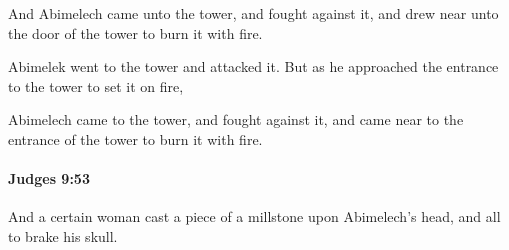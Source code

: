 			\begin{versebox}
					\item[BHS] 
					\item[ASV] And Abimelech came unto the tower, and fought against it, and drew near unto the door of the tower to burn it with fire.
					\item[NIV] Abimelek went to the tower and attacked it. But as he approached the entrance to the tower to set it on fire,
					\item[NRSV] Abimelech came to the tower, and fought against it, and came near to the entrance of the tower to burn it with fire.
			\end{versebox}

		\paragraph{Judges 9:53} %
			\label{JUDGES-9-53}

			And a certain woman cast a piece of a millstone upon Abimelech’s head, and all to brake his skull.

